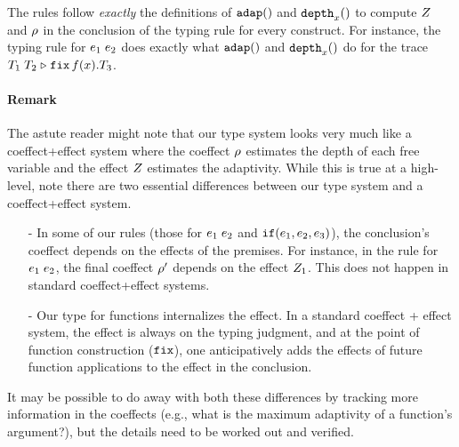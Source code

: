 The rules follow \emph{exactly} the definitions of $\mathtt{adap}()$ and
$\mathtt{depth}_{x}()$ to compute $Z$ and $\rho$ in the conclusion of the
typing rule for every construct. For instance, the typing rule for
$e_1 \; e_2$ does exactly what $\mathtt{adap}()$ and $\mathtt{depth}_{x}()$
do for the trace $T_1 \; T_2 \mathrel{\triangleright} {\mathop{\mathtt{fix}} f(x).T_3}$.

\paragraph{Remark}
The astute reader might note that our type system looks very much like
a coeffect+effect system where the coeffect $\rho$ estimates the
depth of each free variable and the effect $Z$ estimates the
adaptivity. While this is true at a high-level, note there are two
essential differences between our type system and a coeffect+effect
system.
\begin{itemize}
\item[-] In some of our rules (those for $e_1 \; e_2$ and
  $\mathtt{if}(e_1, e_2, e_3)$), the conclusion's coeffect
  depends on the effects of the premises. For instance, in the rule
  for $e_1 \; e_2$, the final coeffect $\rho'$ depends on
  the effect $Z_1$. This does not happen in standard
  coeffect+effect systems.
\item[-] Our type for functions internalizes the effect. In a standard
  coeffect + effect system, the effect is always on the typing  judgment, and at the point of function construction ($\mathop{\mathtt{fix}}$), one
  anticipatively adds the effects of future function applications to
  the effect in the conclusion.
\end{itemize}
It may be possible to do away with both these differences by tracking
more information in the coeffects (e.g., what is the maximum
adaptivity of a function's argument?), but the details need to be
worked out and verified.
